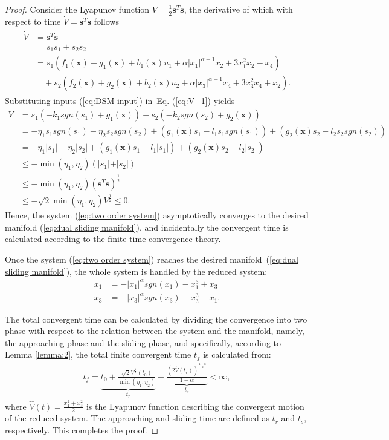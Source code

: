 \documentclass[3p]{elsarticle}
\theoremstyle{plain}
\theoremstyle{remark}
\begin{document}
\begin{proof}
Consider the Lyapunov function $V=\frac{1}{2}{\bm s}^T\bm s$, the derivative of which with respect to time $\dot V = {\bm s}^T \bm {\dot s}$ follows
\begin{align}
\begin{split}
\dot V &= {\bm s}^T\dot{\bm  s}\\
&=s_1\dot s_1+s_2\dot s_2\\
&=s_1(f_1(\bm x)+g_1(\bm x)+b_1(\bm x)u_1+\alpha\vert x_1\vert^{\alpha-1}x_2+3x_1^2x_2-x_4)\\
&\quad +s_2(f_2(\bm x)+g_2(\bm x)+b_2(\bm x)u_2+\alpha\vert x_3\vert^{\alpha-1}x_4+3x_3^2x_4+x_2).\label{eq:V_1}
\end{split}
\end{align}
Substituting inputs (\ref{eq:DSM input}) in~Eq. (\ref{eq:V_1}) yields
\begin{align*}
\dot V &= s_1(-k_1sgn(s_1)+g_1(\bm x))+s_2(-k_2sgn(s_2)+g_2(\bm x))\\
&= -\eta_1s_1sgn(s_1)-\eta_2s_2sgn(s_2)+(g_1(\bm x)s_1 - l_1s_1sgn(s_1))+(g_2(\bm x)s_2 - l_2s_2sgn(s_2))\\
&= -\eta_1\vert s_1\vert-\eta_2\vert s_2\vert+(g_1(\bm x)s_1 - l_1\vert s_1\vert)+(g_2(\bm x)s_2 - l_2\vert s_2\vert)\\
&\le - \min(\eta_1,\eta_2)(\vert s_1\vert+\vert s_2\vert)\\
&\le -\min(\eta_1,\eta_2)({\bm s}^T\bm s)^\frac{1}{2}\\
&\le -\sqrt{2}\min(\eta_1,\eta_2)V^\frac{1}{2}\le 0.
\end{align*}
Hence, the system (\ref{eq:two order system}) asymptotically converges to the desired manifold (\ref{eq:dual sliding manifold}), and incidentally the convergent time is calculated according to the finite time convergence theory.\par
Once the system (\ref{eq:two order system}) reaches the desired manifold~(\ref{eq:dual sliding manifold}), the whole system is handled by the reduced system:
\begin{align*}
\dot x_1&=-\vert x_1\vert^\alpha sgn(x_1)-x_1^3+x_3\\
\dot x_3&=-\vert x_3\vert^\alpha sgn(x_3)-x_3^3-x_1.
\end{align*}\par
The total convergent time can be calculated by dividing the convergence into two phase with respect to the relation between the system and the manifold, namely, the approaching phase and the sliding phase, and specifically, according to Lemma \ref{lemma:2}, the total finite convergent time $t_f$ is calculated from:
\begin{align}
t_f = \underbrace{t_0+\frac{\sqrt{2}V^{\frac{1}{2}}(t_0)}{\min(\eta_1,\eta_2)}}_{t_r}+\underbrace{\frac{(2\hat V(t_r))^{\frac{1-\alpha}{2}}}{1-\alpha}}_{t_s}<\infty,
\end{align}
where $\hat V(t) = \frac{x_1^2+x_3^2}{2}$ is the Lyapunov function describing the convergent motion of the reduced system. The approaching and sliding time are defined as $t_r$ and $t_s$, respectively. This completes the proof.
\end{proof}
\end{document}
